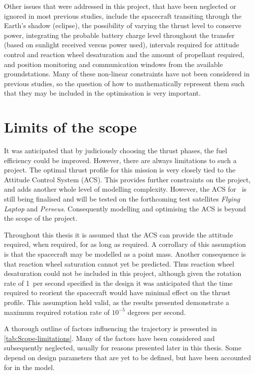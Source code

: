 Other issues that were addressed in this project, that have been neglected or ignored in most previous studies, include the spacecraft transiting through the Earth's shadow (eclipse), the possibility of varying the thrust level to conserve power, integrating the probable battery charge level throughout the transfer (based on sunlight received versus power used), intervals required for attitude control and reaction wheel desaturation and the amount of propellant required, and position monitoring and communication windows from the available groundstations. Many of these non-linear constraints have not been considered in previous studies, so the question of how to mathematically represent them such that they may be included in the optimisation is very important.


\section{Limits of the scope} \label{sec:Limits}

It was anticipated that by judiciously choosing the thrust phases, the fuel efficiency could be improved. However, there are always limitations to such a project. The optimal thrust profile for this mission is very closely tied to the Attitude Control System (ACS). This provides further constraints on the project, and adds another whole level of modelling complexity. However, the ACS for \BW\ is still being finalised and will be tested on the forthcoming test satellites \emph{Flying Laptop} and \emph{Perseus}. Consequently modelling and optimising the ACS is beyond the scope of the project. 

Throughout this thesis it is assumed that the ACS can provide the attitude required, when required, for as long as required. A corrollary of this assumption is that the spacecraft may be modelled as a point mass. Another consequence is that reaction wheel saturation cannot yet be predicted. Thus reaction wheel desaturation could not be included in this project, although given the rotation rate of 1\degrees\ per second specified in the design it was anticipated that the time required to reorient the spacecraft would have minimal effect on the thrust profile. This assumption held valid, as the results presented demonstrate a maximum required rotation rate of $10^{-5}$ degrees per second.

A thorough outline of factors influencing the trajectory is presented in \autoref{tab:Scope-limitations}. Many of the factors have been considered and subsequently neglected, usually for reasons presented later in this thesis. Some depend on design parameters that are yet to be defined, but have been accounted for in the model.

